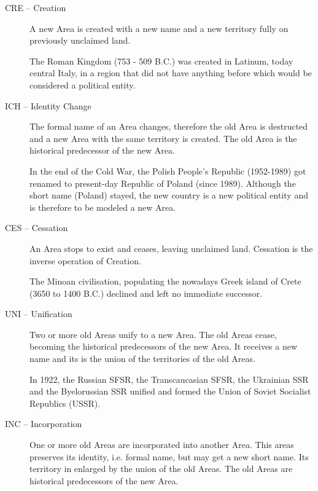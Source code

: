 \begin{description}
  \item[CRE -- Creation]
  A new Area is created with a new name and a new territory fully on previously unclaimed land. \\
  \begin{footnotesize}
    The Roman Kingdom (753 - 509 B.C.) was created in Latinum, today central Italy, in a region that did not have anything before which would be considered a political entity.
  \end{footnotesize}
  \item[ICH -- Identity Change]
  The formal name of an Area changes, therefore the old Area is destructed and a new Area with the same territory is created. The old Area is the historical predecessor of the new Area. \\
  \begin{footnotesize}
    In the end of the Cold War, the Polish People's Republic (1952-1989) got renamed to present-day Republic of Poland (since 1989). Although the short name (Poland) stayed, the new country is a new political entity and is therefore to be modeled a new Area.
  \end{footnotesize}
  \item[CES -- Cessation]
  An Area stops to exist and ceases, leaving unclaimed land. Cessation is the inverse operation of Creation. \\
  \begin{footnotesize}
    The Minoan civilisation, populating the nowadays Greek island of Crete (3650 to 1400 B.C.) declined and left no immediate successor.
  \end{footnotesize}
  \item[UNI -- Unification]
  Two or more old Areas unify to a new Area. The old Areas cease, becoming the historical predecessors of the new Area. It receives a new name and its is the union of the territories of the old Areas. \\
  \begin{footnotesize}
    In 1922, the Russian SFSR, the Transcaucasian SFSR, the Ukrainian SSR and the Byelorussian SSR unified and formed the Union of Soviet Socialist Republics (USSR).
  \end{footnotesize}
  \item[INC -- Incorporation]
  One or more old Areas are incorporated into another Area. This areas preserves its identity, i.e. formal name, but may get a new short name. Its territory in enlarged by the union of the old Areas. The old Areas are historical predecessors of the new Area. \\

\end{description}
